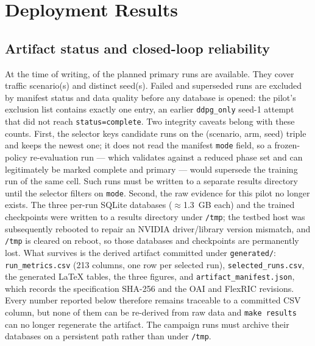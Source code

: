 \section{Deployment Results}
\label{sec:results}
\label{sec:results-anchor}

\subsection{Artifact status and closed-loop reliability}
At the time of writing, \ValidRunCount{} of the \ExpectedRunCount{} planned primary runs are
available. They cover \AvailableScenarioCount{} traffic scenario(s) and
\AvailableSeedCount{} distinct seed(s). Failed and superseded runs are excluded by manifest
status and data quality before any database is opened: the pilot's exclusion list contains
exactly one entry, an earlier \texttt{ddpg\_only} seed-1 attempt that did not reach
\texttt{status=complete}. Two integrity caveats belong with these counts. First, the selector
keys candidate runs on the (scenario, arm, seed) triple and keeps the newest one; it does not
read the manifest \texttt{mode} field, so a frozen-policy re-evaluation run --- which validates
against a reduced phase set and can legitimately be marked complete and primary --- would
supersede the training run of the same cell. Such runs must be written to a separate results
directory until the selector filters on \texttt{mode}. Second, the raw evidence for this pilot
no longer exists. The three per-run SQLite databases ($\approx$1.3~GB each) and the trained
checkpoints were written to a results directory under \texttt{/tmp}; the testbed host was
subsequently rebooted to repair an NVIDIA driver/library version mismatch, and \texttt{/tmp} is
cleared on reboot, so those databases and checkpoints are permanently lost. What survives is
the derived artifact committed under \texttt{generated/}: \texttt{run\_metrics.csv} (213
columns, one row per selected run), \texttt{selected\_runs.csv}, the generated \LaTeX{} tables,
the three figures, and \texttt{artifact\_manifest.json}, which records the specification
SHA-256 and the OAI and FlexRIC revisions. Every number reported below therefore remains
traceable to a committed CSV column, but none of them can be re-derived from raw data and
\texttt{make results} can no longer regenerate the artifact. The campaign runs must archive
their databases on a persistent path rather than under \texttt{/tmp}.


